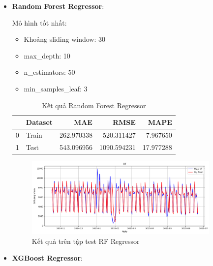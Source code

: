 \begin{itemize}
            \FloatBarrier
            
        \item \textbf{Random Forest Regressor}:

            Mô hình tốt nhất:
            \begin{itemize}
                \item Khoảng sliding window: 30
                \item max\_depth: 10
                \item n\_estimators: 50
                \item min\_samples\_leaf: 3
            \end{itemize}

            \begin{table}[htbp]
                \centering
                \caption{Kết quả Random Forest Regressor}
                \label{tab:yte-sl-rf}
                \begin{tabular}{llrrr}
                \hline
                 & Dataset & MAE & RMSE & MAPE \\
                \hline
                0 & Train & 262.970338 & 520.311427 & 7.967650 \\
                1 & Test & 543.096956 & 1090.594231 & 17.977288 \\
                \hline
                \end{tabular}
            \end{table}
            
            \FloatBarrier

            \begin{figure}[htp]
                \centering
                \includegraphics[width=0.90\textwidth]{images/TS_yte_pred_cmp_RF.png}
                \caption{Kết quả trên tập test RF Regressor}
                \label{fig:TS_yte_pred_cmp_RF}
            \end{figure}
            \FloatBarrier

        \item \textbf{XGBoost Regressor}:
        

\end{itemize}
